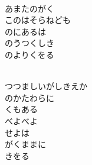\documentclass[10pt,b5j]{tarticle} %
\begin{document}
\begin{enumerate}
\begin{minipage}[c]{\blocksize}
    \end{minipage}
    \begin{minipage}[c]{\blocksize}
        
        \vspace{\linespace}
        \item~\\
        あまたのがく\\
        このはそらねども\\
        のにあるは\\
        のうつくしき\\
        のよりくをる
        
    \end{minipage}
    \begin{minipage}[c]{\blocksize}
        
        \vspace{\linespace}
        \item~\\
        つつましいがしきえか\\
        のかたわらに\\
        くもある\\
        べよべよ\\
        せよは\\
        がくままに\\
        きをる
    
    \end{minipage}
\end{enumerate} %
\end{document}
